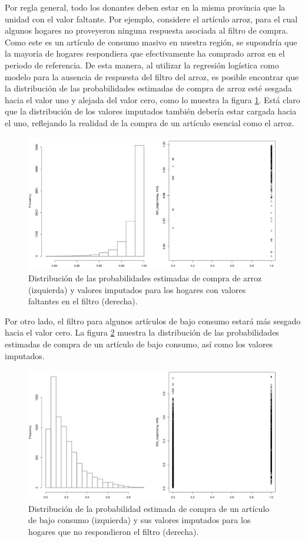 \documentclass[
  12pt,
]{book}
\begin{document}
Por regla general, todo los donantes deben estar en la misma provincia que la unidad con el valor faltante. Por ejemplo, considere el artículo arroz, para el cual algunos hogares no proveyeron ninguna respuesta asociada al filtro de compra. Como este es un artículo de consumo masivo en nuestra región, se supondría que la mayoría de hogares respondiera que efectivamente ha comprado arroz en el periodo de referencia. De esta manera, al utilizar la regresión logística como modelo para la ausencia de respuesta del filtro del arroz, es posible encontrar que la distribución de las probabilidades estimadas de compra de arroz esté sesgada hacia el valor uno y alejada del valor cero, como lo muestra la figura \ref{fig:fig11}. Está claro que la distribución de los valores imputados también debería estar cargada hacia el uno, reflejando la realidad de la compra de un artículo esencial como el arroz.

\begin{figure}
\includegraphics[width=0.5\linewidth]{Pics/11} \caption{Distribución de las probabilidades estimadas de compra de arroz (izquierda) y valores imputados para los hogares con valores faltantes en el filtro (derecha).}\label{fig:fig11}
\end{figure}

Por otro lado, el filtro para algunos artículos de bajo consumo estará más sesgado hacia el valor cero. La figura \ref{fig:fig12} muestra la distribución de las probabilidades estimadas de compra de un artículo de bajo consumo, así como los valores imputados.

\begin{figure}
\includegraphics[width=0.5\linewidth]{Pics/12} \caption{Distribución de la probabilidad estimada de compra de un artículo de bajo consumo (izquierda) y sus valores imputados para los hogares que no respondieron el filtro (derecha).}\label{fig:fig12}
\end{figure}
\end{document}
